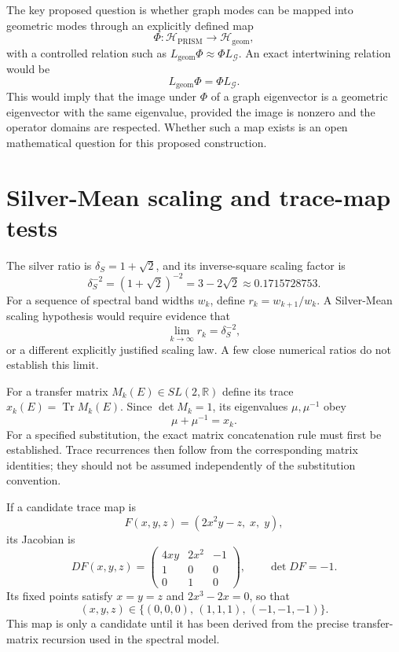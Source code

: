 \documentclass[11pt,a4paper]{article}
\newcommand{\RR}{\mathbb{R}}
\newcommand{\Tr}{\operatorname{Tr}}
\begin{document}
The key proposed question is whether graph modes can be mapped into geometric
modes through an explicitly defined map
\begin{equation}
\Phi:\mathcal H_{\mathrm{PRISM}}\longrightarrow\mathcal H_{\mathrm{geom}},
\end{equation}
with a controlled relation such as $L_{\mathrm{geom}}\Phi\approx\Phi L_{\mathcal G}$.
An exact intertwining relation would be
\begin{equation}
L_{\mathrm{geom}}\Phi=\Phi L_{\mathcal G}.
\end{equation}
This would imply that the image under $\Phi$ of a graph eigenvector is a
geometric eigenvector with the same eigenvalue, provided the image is nonzero
and the operator domains are respected. Whether such a map exists is an open
mathematical question for this proposed construction.

\section{Silver-Mean scaling and trace-map tests}

The silver ratio is $\delta_S=1+\sqrt2$, and its inverse-square scaling factor is
\begin{equation}
\delta_S^{-2}=(1+\sqrt2)^{-2}=3-2\sqrt2\approx0.1715728753 .
\end{equation}
For a sequence of spectral band widths $w_k$, define $r_k=w_{k+1}/w_k$. A
Silver-Mean scaling hypothesis would require evidence that
\begin{equation}
\lim_{k\to\infty}r_k=\delta_S^{-2},
\end{equation}
or a different explicitly justified scaling law. A few close numerical ratios do
not establish this limit.

For a transfer matrix $M_k(E)\in SL(2,\RR)$ define its trace
$x_k(E)=\Tr M_k(E)$. Since $\det M_k=1$, its eigenvalues $\mu,\mu^{-1}$ obey
\begin{equation}
\mu+\mu^{-1}=x_k .
\end{equation}
For a specified substitution, the exact matrix concatenation rule must first be
established. Trace recurrences then follow from the corresponding matrix
identities; they should not be assumed independently of the substitution
convention.

If a candidate trace map is
\begin{equation}
F(x,y,z)=(2x^2y-z,\;x,\;y),
\end{equation}
its Jacobian is
\begin{equation}
DF(x,y,z)=
\begin{pmatrix}
4xy & 2x^2 & -1\\
1 & 0 & 0\\
0 & 1 & 0
\end{pmatrix},\qquad \det DF=-1 .
\end{equation}
Its fixed points satisfy $x=y=z$ and $2x^3-2x=0$, so that
\begin{equation}
(x,y,z)\in\{(0,0,0),\,(1,1,1),\,(-1,-1,-1)\}.
\end{equation}
This map is only a candidate until it has been derived from the precise
transfer-matrix recursion used in the spectral model.
\end{document}
